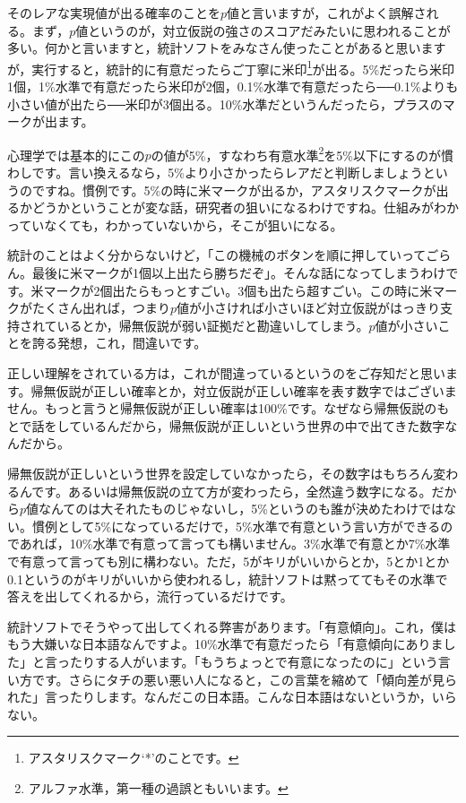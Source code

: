 \documentclass{ltjsbook}
\begin{document}
そのレアな実現値が出る確率のことを$p$値と言いますが，これがよく誤解される。まず，$p$値というのが，対立仮説の強さのスコアだみたいに思われることが多い。何かと言いますと，統計ソフトをみなさん使ったことがあると思いますが，実行すると，統計的に有意だったらご丁寧に米印\footnote{アスタリスクマーク`*'のことです。}が出る。5\%だったら米印1個，1\%水準で有意だったら米印が2個，0.1\%水準で有意だったら──0.1\%よりも小さい値が出たら──米印が3個出る。10\%水準だというんだったら，プラスのマークが出ます。

心理学では基本的にこの$p$の値が5\%，すなわち有意水準\footnote{アルファ水準，第一種の過誤ともいいます。}を5\%以下にするのが慣わしです。言い換えるなら，5\%より小さかったらレアだと判断しましょうというのですね。慣例です。5\%の時に米マークが出るか，アスタリスクマークが出るかどうかということが変な話，研究者の狙いになるわけですね。仕組みがわかっていなくても，わかっていないから，そこが狙いになる。

統計のことはよく分からないけど，「この機械のボタンを順に押していってごらん。最後に米マークが1個以上出たら勝ちだぞ」。そんな話になってしまうわけです。米マークが2個出たらもっとすごい。3個も出たら超すごい。この時に米マークがたくさん出れば，つまり$p$値が小さければ小さいほど対立仮説がはっきり支持されているとか，帰無仮説が弱い証拠だと勘違いしてしまう。$p$値が小さいことを誇る発想，これ，間違いです。

正しい理解をされている方は，これが間違っているというのをご存知だと思います。帰無仮説が正しい確率とか，対立仮説が正しい確率を表す数字ではございません。もっと言うと帰無仮説が正しい確率は100\%です。なぜなら帰無仮説のもとで話をしているんだから，帰無仮説が正しいという世界の中で出てきた数字なんだから。

帰無仮説が正しいという世界を設定していなかったら，その数字はもちろん変わるんです。あるいは帰無仮説の立て方が変わったら，全然違う数字になる。だから$p$値なんてのは大それたものじゃないし，5\%というのも誰が決めたわけではない。慣例として5\%になっているだけで，5\%水準で有意という言い方ができるのであれば，10\%水準で有意って言っても構いません。3\%水準で有意とか7\%水準で有意って言っても別に構わない。ただ，5がキリがいいからとか，5とか1とか0.1というのがキリがいいから使われるし，統計ソフトは黙っててもその水準で答えを出してくれるから，流行っているだけです。

統計ソフトでそうやって出してくれる弊害があります。「有意傾向」。これ，僕はもう大嫌いな日本語なんですよ。10\%水準で有意だったら「有意傾向にありました」と言ったりする人がいます。「もうちょっとで有意になったのに」という言い方です。さらにタチの悪い悪い人になると，この言葉を縮めて「傾向差が見られた」言ったりします。なんだこの日本語。こんな日本語はないというか，いらない。
\end{document}
